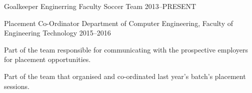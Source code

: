 \begin{cventries}
\cventry%
  {Goalkeeper} %
  {Enginerring Faculty Soccer Team} %
  {} %
  {2013--PRESENT} %
  {%
  }

\cventry%
  {Placement Co-Ordinator} %
  {Department of Computer Engineering, Faculty of Engineering Technology} %
  {} %
  {2015--2016} %
  {%
    \begin{cvitems} %
      \item{Part of the team responsible for communicating with the
            prospective employers for placement opportunities.}
      \item{Part of the team that organised and co-ordinated last year's
            batch's placement sessions.}
    \end{cvitems}
  }

\end{cventries}
